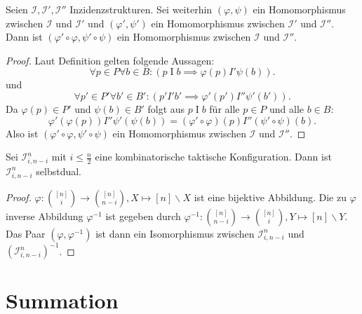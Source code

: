 \documentclass{article}
\begin{document}
\begin{theorem}
  Seien $\mathcal{I}, \mathcal{I}', \mathcal{I}''$ Inzidenzstrukturen.
  Sei weiterhin $(\varphi, \psi)$ ein Homomorphismus zwischen $\mathcal{I}$ und $\mathcal{I}'$
  und $(\varphi', \psi')$ ein Homomorphismus zwischen $\mathcal{I}'$ und $\mathcal{I}''$.
  Dann ist $(\varphi' \circ \varphi, \psi' \circ \psi)$ ein Homomorphismus
  zwischen $\mathcal{I}$ und $\mathcal{I}''$.
\end{theorem}
\begin{proof}
  Laut Definition gelten folgende Aussagen:
  \begin{equation*}
    \forall p \in P \forall b \in B \colon (p \mathrel{I} b \implies \varphi(p) \mathrel{I'} \psi(b)).
  \end{equation*}
  und
  \begin{equation*}
    \forall p' \in P' \forall b' \in B' \colon (p' \mathrel{I'} b' \implies \varphi'(p') \mathrel{I''} \psi'(b')).
  \end{equation*}
  Da $\varphi(p) \in P'$ und $\psi(b) \in B'$ folgt aus $p \mathrel{I} b$ für alle $p \in P$ und alle $b \in B$:
  \begin{equation*}
    \varphi'(\varphi(p)) \mathrel{I''} \psi'(\psi(b)) = (\varphi' \circ \varphi)(p) \mathrel{I''} (\psi' \circ \psi)(b).
  \end{equation*}
  Also ist $(\varphi' \circ \varphi, \psi' \circ \psi)$ ein Homomorphismus
  zwischen $\mathcal{I}$ und $\mathcal{I}''$.
\end{proof}

\begin{theorem}
  Sei $\mathcal{I}^n_{i, n - i}$ mit $i \leq \frac{n}{2}$ eine kombinatorische taktische Konfiguration.
  Dann ist $\mathcal{I}^n_{i, n - i}$ selbstdual.
\end{theorem}
\begin{proof}
  $\varphi \colon \binom{[n]}{i} \to \binom{[n]}{n - i}, X \mapsto [n] \backslash X$ ist eine bijektive Abbildung.
  Die zu $\varphi$ inverse Abbildung $\varphi^{-1}$ ist gegeben durch 
  $\varphi^{-1} \colon \binom{[n]}{n - i} \to \binom{[n]}{i}, Y \mapsto [n] \backslash Y$.
  Das Paar $(\varphi, \varphi^{-1})$ ist dann ein Isomorphismus zwischen $\mathcal{I}^n_{i, n - i}$ und $(\mathcal{I}^n_{i, n - i})^{-1}$.
\end{proof}

\newpage

\section{Summation}
\end{document}
